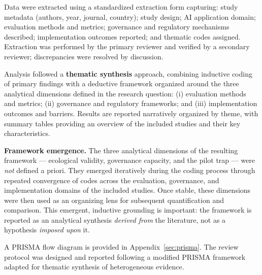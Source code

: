 Data were extracted using a standardized extraction form capturing: study
metadata (authors, year, journal, country); study design; AI application
domain; evaluation methods and metrics; governance and regulatory mechanisms
described; implementation outcomes reported; and thematic codes assigned.
Extraction was performed by the primary reviewer and verified by a secondary
reviewer; discrepancies were resolved by discussion.

Analysis followed a \textbf{thematic synthesis} approach, combining inductive
coding of primary findings with a deductive framework organized around the
three analytical dimensions defined in the research question: (i) evaluation
methods and metrics; (ii) governance and regulatory frameworks; and
(iii) implementation outcomes and barriers. Results are reported narratively
organized by theme, with summary tables providing an overview of the
included studies and their key characteristics.

\textbf{Framework emergence.} The three analytical dimensions of the
resulting framework --- ecological validity, governance capacity, and
the pilot trap --- were \textit{not} defined a priori. They emerged
iteratively during the coding process through repeated convergence of
codes across the evaluation, governance, and implementation domains of
the included studies. Once stable, these dimensions were then used as
an organizing lens for subsequent quantification and comparison. This
emergent, inductive grounding is important: the framework is reported
as an analytical synthesis \textit{derived from} the literature, not
as a hypothesis \textit{imposed upon} it.

A PRISMA flow diagram is provided in Appendix~\ref{sec:prisma}. The review
protocol was designed and reported following a modified PRISMA framework
adapted for thematic synthesis of heterogeneous evidence.